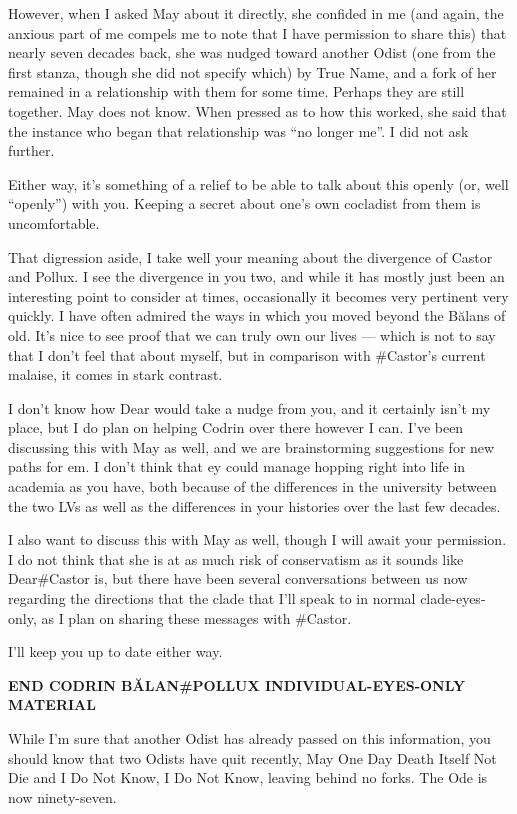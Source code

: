 However, when I asked May about it directly, she confided in me (and again, the anxious part of me compels me to note that I have permission to share this) that nearly seven decades back, she was nudged toward another Odist (one from the first stanza, though she did not specify which) by True Name, and a fork of her remained in a relationship with them for some time. Perhaps they are still together. May does not know. When pressed as to how this worked, she said that the instance who began that relationship was ``no longer me''. I did not ask further.

Either way, it's something of a relief to be able to talk about this openly (or, well ``openly'') with you. Keeping a secret about one's own cocladist from them is uncomfortable.

That digression aside, I take well your meaning about the divergence of Castor and Pollux. I see the divergence in you two, and while it has mostly just been an interesting point to consider at times, occasionally it becomes very pertinent very quickly. I have often admired the ways in which you moved beyond the Bălans of old. It's nice to see proof that we can truly own our lives — which is not to say that I don't feel that about myself, but in comparison with \#Castor's current malaise, it comes in stark contrast.

I don't know how Dear would take a nudge from you, and it certainly isn't my place, but I do plan on helping Codrin over there however I can. I've been discussing this with May as well, and we are brainstorming suggestions for new paths for em. I don't think that ey could manage hopping right into life in academia as you have, both because of the differences in the university between the two LVs as well as the differences in your histories over the last few decades.

I also want to discuss this with May as well, though I will await your permission. I do not think that she is at as much risk of conservatism as it sounds like Dear\#Castor is, but there have been several conversations between us now regarding the directions that the clade that I'll speak to in normal clade-eyes-only, as I plan on sharing these messages with \#Castor.

I'll keep you up to date either way.

\begin{center}
\textbf{END CODRIN BĂLAN\#POLLUX INDIVIDUAL-EYES-ONLY MATERIAL}
\end{center}

While I'm sure that another Odist has already passed on this information, you should know that two Odists have quit recently, May One Day Death Itself Not Die and I Do Not Know, I Do Not Know, leaving behind no forks. The Ode is now ninety-seven.

